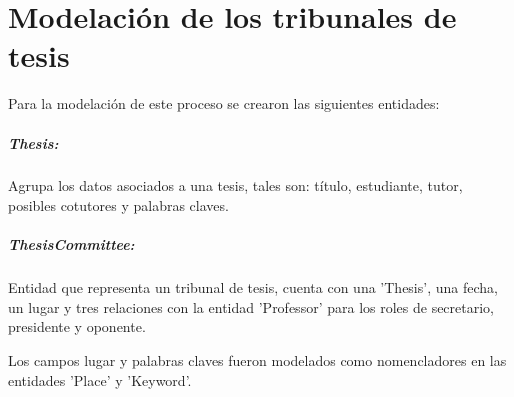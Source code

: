 \section{Modelación de los tribunales de tesis}
Para la modelación de este proceso se crearon las 
siguientes entidades:

\subparagraph{Thesis:}
Agrupa los datos asociados a una tesis, tales son:
título, estudiante, tutor, posibles cotutores y palabras
claves.

\subparagraph{ThesisCommittee:}
Entidad que representa un tribunal de tesis, cuenta con 
una 'Thesis', una fecha, un lugar y tres relaciones con 
la entidad 'Professor' para los roles de
secretario, presidente y oponente.

Los campos lugar y palabras claves fueron modelados como
nomencladores en las entidades 'Place' y 'Keyword'.